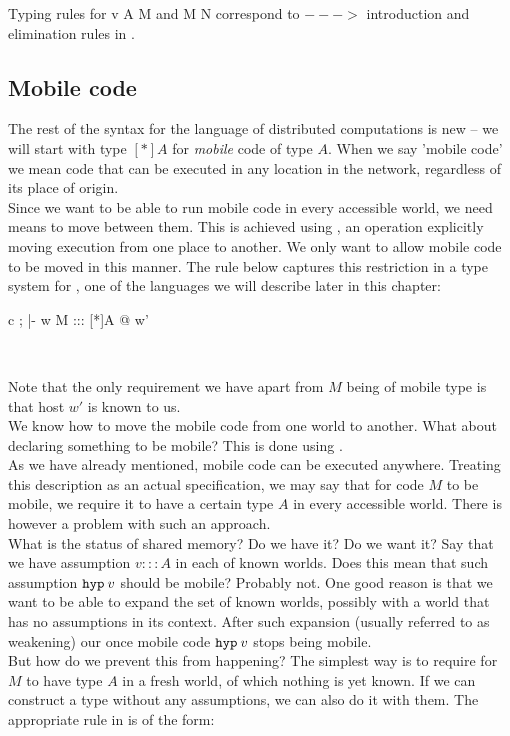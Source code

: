 Typing rules for \lam v A M and \appl M N correspond to $--->$ introduction and elimination rules in \logic{}.

\subsection{Mobile code}
The rest of the syntax for the language of distributed computations is new -- we will start with type $[*]A$ for \emph{mobile} code of type $A$. When we say 'mobile code' we mean code that can be executed in any location in the network, regardless of its place of origin.\\

Since we want to be able to run mobile code in every accessible world, we need means to move between them. This is achieved using , an operation explicitly moving execution from one place to another. We only want to allow mobile code to be moved in this manner. The rule \fetchr{} below captures this restriction in a type system for \langL{}, one of the languages we will describe later in this chapter:

\begin{center}
\footnotesize
\begin{tabular}{ c }
			      {\Omega; \Gamma |- \fetch w M ::: [*]A @ w'}
\end{tabular}\\
\normalsize
\end{center}

Note that the only requirement we have apart from $M$ being of mobile type is that host $w'$ is known to us.\\

We know how to move the mobile code from one world to another. What about declaring something to be mobile? This is done using .\\
As we have already mentioned, mobile code can be executed anywhere. Treating this description as an actual specification, we may say that for code $M$ to be mobile, we require it to have a certain type $A$ in every accessible world. There is however a problem with such an approach.\\

What is the status of shared memory? Do we have it? Do we want it? Say that we have assumption $v ::: A$ in each of known worlds. Does this mean that such assumption $\mbox{$\operatorname{\texttt{hyp}}_{} {v}$}$ should be mobile? Probably not. One good reason is that we want to be able to expand the set of known worlds, possibly with a world that has no assumptions in its context. After such expansion (usually referred to as weakening) our once mobile code $\mbox{$\operatorname{\texttt{hyp}}_{} {v}$}$ stops being mobile.\\
But how do we prevent this from happening? The simplest way is to require for $M$ to have type $A$ in a fresh world, of which nothing is yet known. If we can construct a type without any assumptions, we can also do it with them. The appropriate rule in \langL{} is of the form:

